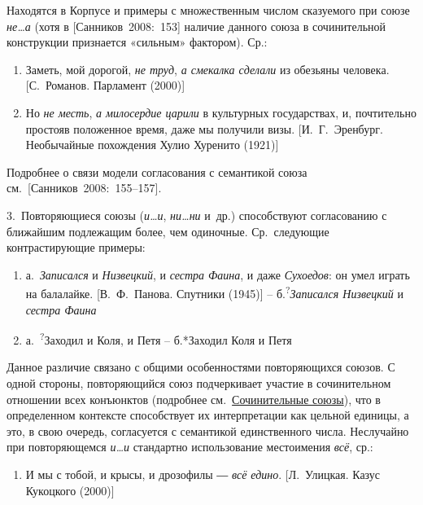 Находятся в Корпусе и примеры с множественным числом сказуемого при
союзе \emph{не\ldots а} (хотя в {[}Санников~2008:~153{]} наличие данного
союза в сочинительной конструкции признается «сильным» фактором). Ср.:

\begin{enumerate}
\def\labelenumi{(\arabic{enumi})}
\setcounter{enumi}{108}
\item
  Заметь, мой дорогой, \emph{не труд}, \emph{а смекалка сделали} из
  обезьяны человека. {[}С.~Романов. Парламент (2000){]}
\item
  Но \emph{не месть}, \emph{а милосердие царили} в культурных
  государствах, и, почтительно простояв положенное время, даже мы
  получили визы. {[}И.~Г.~Эренбург. Необычайные похождения Хулио
  Хуренито (1921){]}
\end{enumerate}

Подробнее о связи модели согласования с семантикой союза
см.~{[}Санников~2008:~155--157{]}.

3.~Повторяющиеся союзы (\emph{и\ldots и}, \emph{ни\ldots ни} и~др.)
способствуют согласованию с ближайшим подлежащим более, чем одиночные.
Ср.~следующие контрастирующие примеры:

\begin{enumerate}
\def\labelenumi{(\arabic{enumi})}
\setcounter{enumi}{110}
\item
  а.~\emph{Записался} и \emph{Низвецкий}, и \emph{сестра Фаина}, и даже
  \emph{Сухоедов}: он умел играть на балалайке. {[}В.~Ф.~Панова.
  Спутники (1945){]} -- б.\textsuperscript{?}\emph{Записался Низвецкий}
  и \emph{сестра Фаина}
\item
  а.~\textsuperscript{?}Заходил и Коля, и Петя -- б.*Заходил Коля и Петя
\end{enumerate}

Данное различие связано с общими особенностями повторяющихся союзов. С
одной стороны, повторяющийся союз подчеркивает участие в сочинительном
отношении всех конъюнктов (подробнее см.~\underline{Сочинительные
союзы}), что в определенном контексте способствует их интерпретации как
цельной единицы, а это, в свою очередь, согласуется с семантикой
единственного числа. Неслучайно при повторяющемся \emph{и\ldots и}
стандартно использование местоимения \emph{всё}, ср.:

\begin{enumerate}
\def\labelenumi{(\arabic{enumi})}
\setcounter{enumi}{112}
\item
  И мы с тобой, и крысы, и дрозофилы ― \emph{всё едино}. {[}Л.~Улицкая.
  Казус Кукоцкого (2000){]}
\end{enumerate}

